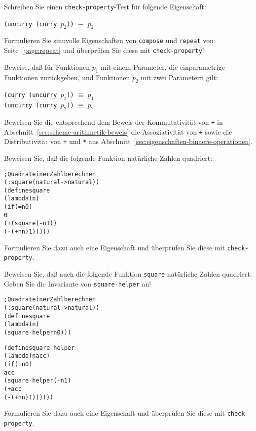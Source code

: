 \begin{aufgabe}
  Schreiben Sie einen \texttt{check-property}-Test für folgende Eigenschaft:
  \begin{center}
    \texttt{(uncurry (curry $p_2$))} $\equiv$ $p_2$
  \end{center}
\end{aufgabe}

\begin{aufgabe}
  Formulieren Sie sinnvolle Eigenschaften von \texttt{compose} und
  \texttt{repeat} von Seite~\ref{page:repeat} und überprüfen Sie
  diese mit \texttt{check-property}!
\end{aufgabe}

\begin{aufgabe}
  Beweise, daß für Funktionen $p_1$ mit einem Parameter, die
  einparametrige Funktionen zurückgeben, und Funktionen $p_2$ mit zwei
  Parametern gilt:
  \begin{center}
    \texttt{(curry (uncurry $p_1$))} $\equiv$ $p_1$\\
    \texttt{(uncurry (curry $p_2$))} $\equiv$ $p_2$
  \end{center}
\end{aufgabe}

\begin{aufgabe}
  Beweisen Sie die entsprechend dem Beweis der Kommutativität von
  \texttt{+} in Abschnitt~\ref{sec:scheme-arithmetik-beweis} die
  Assoziativität von \texttt{+} sowie die Distributivität von
  \texttt{+} und \texttt{*} aus
  Abschnitt~\ref{sec:eigenschaften-binaere-operationen}.
\end{aufgabe}

\begin{aufgabe}
Beweisen Sie, daß die
folgende Funktion natürliche Zahlen quadriert:
%
\begin{alltt}
; Quadrat einer Zahl berechnen
(: square (natural -> natural))
(define square
  (lambda (n)
    (if (= n 0)
        0
        (+ (square (- n 1))
           (- (+ n n) 1)))))
\end{alltt}
%
Formulieren Sie dazu auch eine Eigenschaft und überprüfen Sie diese
mit \texttt{check-property}.
%
\end{aufgabe}

\begin{aufgabe}
Beweisen Sie, daß auch die folgende Funktion \texttt{square}
natürliche Zahlen quadriert.  Geben Sie die Invariante von
\texttt{square-helper} an!
%
\begin{alltt}
; Quadrat einer Zahl berechnen
(: square (natural -> natural))
(define square
  (lambda (n)
    (square-helper n 0)))

(define square-helper
  (lambda (n acc)
    (if (= n 0)
        acc
        (square-helper (- n 1)
                       (+ acc
                          (- (+ n n) 1))))))
\end{alltt}
Formulieren Sie dazu auch eine Eigenschaft und überprüfen Sie diese
mit \texttt{check-property}.
\end{aufgabe}

